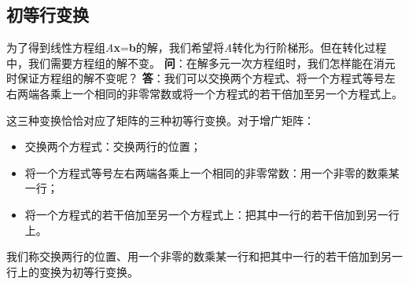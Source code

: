 \documentclass{ctexart}
\begin{document}
\subsection{初等行变换}
为了得到线性方程组\textit{A}\textbf{x}=\textbf{b}的解，我们希望将\textit{A}转化为行阶梯形。但在转化过程中，我们需要方程组的解不变。
\newline
\textbf{问}：在解多元一次方程组时，我们怎样能在消元时保证方程组的解不变呢？
\newline
\textbf{答}：我们可以交换两个方程式、将一个方程式等号左右两端各乘上一个相同的非零常数或将一个方程式的若干倍加至另一个方程式上。
\newline\par
这三种变换恰恰对应了矩阵的三种初等行变换。对于增广矩阵：
\begin{itemize}
    \item 交换两个方程式：交换两行的位置；
    \item 将一个方程式等号左右两端各乘上一个相同的非零常数：用一个非零的数乘某一行；
    \item 将一个方程式的若干倍加至另一个方程式上：把其中一行的若干倍加到另一行上。
\end{itemize}
\par
我们称交换两行的位置、用一个非零的数乘某一行和把其中一行的若干倍加到另一行上的变换为初等行变换。
\end{document}
